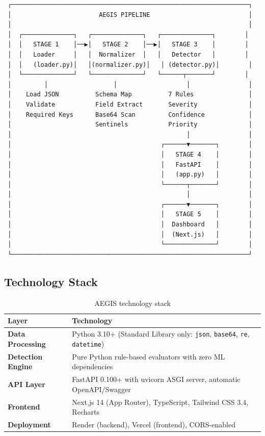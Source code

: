 \documentclass[12pt,a4paper]{article}
\begin{document}
\begin{infobox}
\begin{verbatim}
 ┌─────────────────────────────────────────────────────────────────┐
 │                        AEGIS PIPELINE                           │
 │                                                                 │
 │  ┌──────────────┐   ┌──────────────┐   ┌──────────────┐        │
 │  │   STAGE 1    │──▶│   STAGE 2    │──▶│   STAGE 3    │        │
 │  │   Loader     │   │  Normalizer  │   │   Detector   │        │
 │  │   (loader.py)│   │(normalizer.py)│   │ (detector.py)│        │
 │  └──────────────┘   └──────────────┘   └──────┬───────┘        │
 │         │                  │                   │                │
 │    Load JSON          Schema Map          7 Rules               │
 │    Validate           Field Extract       Severity              │
 │    Required Keys      Base64 Scan         Confidence            │
 │                       Sentinels           Priority              │
 │                                                │                │
 │                                         ┌──────▼───────┐        │
 │                                         │   STAGE 4    │        │
 │                                         │   FastAPI    │        │
 │                                         │   (app.py)   │        │
 │                                         └──────┬───────┘        │
 │                                                │                │
 │                                         ┌──────▼───────┐        │
 │                                         │   STAGE 5    │        │
 │                                         │  Dashboard   │        │
 │                                         │  (Next.js)   │        │
 │                                         └──────────────┘        │
 └─────────────────────────────────────────────────────────────────┘
\end{verbatim}
\end{infobox}

\subsection{Technology Stack}

\begin{table}[H]
\centering
\begin{tabularx}{\linewidth}{>{\bfseries}l X}
\toprule
Layer & Technology \\
\midrule
Data Processing & Python 3.10+ (Standard Library only: \texttt{json}, \texttt{base64}, \texttt{re}, \texttt{datetime}) \\
Detection Engine & Pure Python rule-based evaluators with zero ML dependencies \\
API Layer & FastAPI 0.100+ with uvicorn ASGI server, automatic OpenAPI/Swagger \\
Frontend & Next.js 14 (App Router), TypeScript, Tailwind CSS 3.4, Recharts \\
Deployment & Render (backend), Vercel (frontend), CORS-enabled \\
\bottomrule
\end{tabularx}
\caption{AEGIS technology stack}
\end{table}
\end{document}
